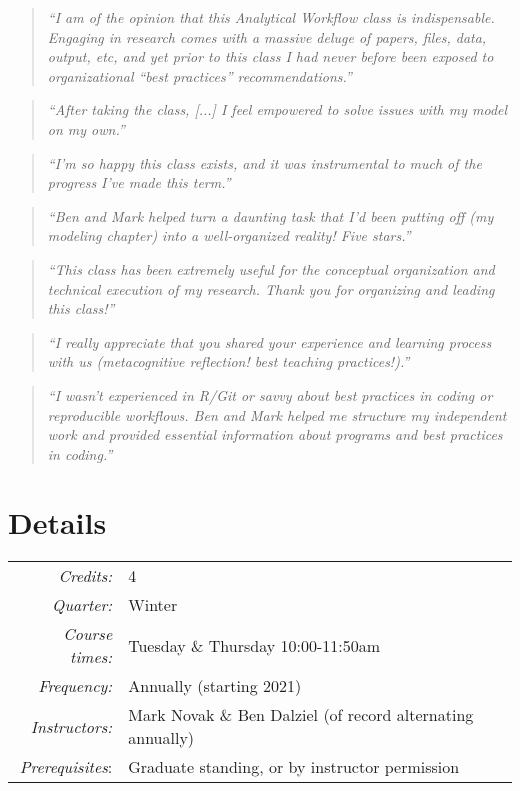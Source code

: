 \documentclass[10pt]{article}
\begin{document}
\begin{quote}
	\emph{``I am of the opinion that this Analytical Workflow class is indispensable. Engaging in research comes with a massive deluge of papers, files, data, output, etc, and yet prior to this class I had never before been exposed to organizational ``best practices'' recommendations.''}
\end{quote}
\begin{quote}
	\emph{``After taking the class, [...] I feel empowered to solve issues with my model on my own.''}
\end{quote}
\begin{quote}
	\emph{``I'm so happy this class exists, and it was instrumental to much of the progress I've made this term.''}
\end{quote}
\begin{quote}
\emph{``Ben and Mark helped turn a daunting task that I'd been putting off (my modeling chapter) into a well-organized reality! Five stars.''}
\end{quote}
\begin{quote}
	\emph{``This class has been extremely useful for the conceptual organization and technical execution of my research. Thank you for organizing and leading this class!''}
\end{quote}
\begin{quote}
	\emph{``I really appreciate that you shared your experience and learning process with us (metacognitive reflection! best teaching practices!).''}
\end{quote}
\begin{quote}
	\emph{``I wasn't experienced in R/Git or savvy about best practices in coding or reproducible workflows. Ben and Mark helped me structure my independent work and provided essential information about programs and best practices in coding.''}
\end{quote}


\section*{Details}
\begin{tabular}{rl}
	\emph{Credits:}	&  4\\ 
	\emph{Quarter:} & Winter\\
	\emph{Course times:} &  Tuesday \& Thursday 10:00-11:50am\\
	\emph{Frequency:} & Annually (starting 2021)\\
	\emph{Instructors:} & Mark Novak \& Ben Dalziel (of record alternating annually)\\
	\emph{Prerequisites}: & Graduate standing, or by instructor permission
\end{tabular} 
\end{document}
